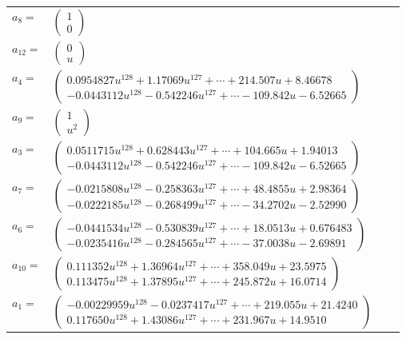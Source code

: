 \documentclass[1p]{elsarticle_modified}
\theoremstyle{definition}
\begin{document}
\begin{tabular}{m{7pt} m{180pt} m{7pt} m{180pt} }
\flushright $a_{8}=$&$\begin{pmatrix}1\\0\end{pmatrix}$ \\
\flushright $a_{12}=$&$\begin{pmatrix}0\\u\end{pmatrix}$ \\
\flushright $a_{4}=$&$\begin{pmatrix}0.0954827 u^{128}+1.17069 u^{127}+\cdots+214.507 u+8.46678\\-0.0443112 u^{128}-0.542246 u^{127}+\cdots-109.842 u-6.52665\end{pmatrix}$ \\
\flushright $a_{9}=$&$\begin{pmatrix}1\\u^2\end{pmatrix}$ \\
\flushright $a_{3}=$&$\begin{pmatrix}0.0511715 u^{128}+0.628443 u^{127}+\cdots+104.665 u+1.94013\\-0.0443112 u^{128}-0.542246 u^{127}+\cdots-109.842 u-6.52665\end{pmatrix}$ \\
\flushright $a_{7}=$&$\begin{pmatrix}-0.0215808 u^{128}-0.258363 u^{127}+\cdots+48.4855 u+2.98364\\-0.0222185 u^{128}-0.268499 u^{127}+\cdots-34.2702 u-2.52990\end{pmatrix}$ \\
\flushright $a_{6}=$&$\begin{pmatrix}-0.0441534 u^{128}-0.530839 u^{127}+\cdots+18.0513 u+0.676483\\-0.0235416 u^{128}-0.284565 u^{127}+\cdots-37.0038 u-2.69891\end{pmatrix}$ \\
\flushright $a_{10}=$&$\begin{pmatrix}0.111352 u^{128}+1.36964 u^{127}+\cdots+358.049 u+23.5975\\0.113475 u^{128}+1.37895 u^{127}+\cdots+245.872 u+16.0714\end{pmatrix}$ \\
\flushright $a_{1}=$&$\begin{pmatrix}-0.00229959 u^{128}-0.0237417 u^{127}+\cdots+219.055 u+21.4240\\0.117650 u^{128}+1.43086 u^{127}+\cdots+231.967 u+14.9510\end{pmatrix}$ \\

\end{tabular}
\end{document}

